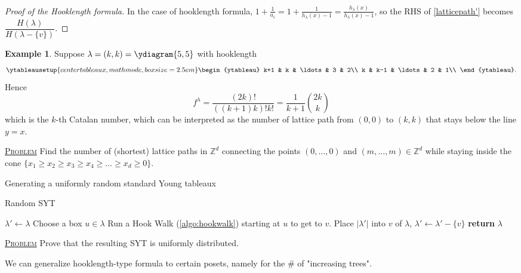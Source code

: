 \documentclass{report}
\newcommand{\Z}{\mathbb{Z}}
\newcommand{\fancyem}[1]{\underline{\textsc{#1}}}
\theoremstyle{definition}
\newtheorem{example}{Example}[section]
\theoremstyle{remark}
\numberwithin{equation}{section}
\begin{document}
\begin{proof}[Proof of the Hooklength formula]
In the case of hooklength formula, $\displaystyle 1 + \frac{1}{a_i} = 1 + \frac{1}{h_\lambda(x) - 1} = \frac{h_\lambda(x)}{h_\lambda(x) - 1}$, so the RHS of \eqref{latticepath'} becomes $\dfrac{H(\lambda)}{H(\lambda - \{v\})}$.
\end{proof}

\begin{example}
    Suppose $\lambda = (k, k) = \ydiagram{5, 5}$ with hooklength \[
        \ytableausetup{centertableaux, mathmode, boxsize=2.5em}
        \begin{ytableau}
            k+1 & k & \ldots & 3 & 2\\
            k & k-1 & \ldots & 2 & 1\\
        \end{ytableau}.
    \] Hence \[
        f^{\lambda} = \frac{(2k)!}{((k+1)k)!k!} = \frac{1}{k+1}\binom{2k}{k}
    \] which is the $k$-th Catalan number, which can be interpreted as the number of lattice path from $(0, 0)$ to $(k, k)$ that stays below the line $y = x$.
\end{example}

\fancyem{Problem} Find the number of (shortest) lattice paths in $\Z^d$ connecting the points $(0, \ldots, 0)$ and $(m, \ldots, m) \in \Z^d$ while staying inside the cone $\{x_1 \geq x_2 \geq x_3 \geq x_4 \geq \ldots \geq x_d \geq 0\}$.

Generating a uniformly random standard Young tableaux

\begin{algorithm}[h]
    \caption{Random SYT}
    \label{algo:unirandSYT}
    \begin{algorithmic}[1]
            \State $\lambda' \gets \lambda$
            \State Choose a box $u \in \lambda$
            \State Run a Hook Walk (\autoref{algo:hookwalk}) starting at $u$ to get to $v$.
            \State Place $|\lambda'|$ into $v$ of $\lambda$, $\lambda' \gets \lambda' - \{v\}$
            \EndWhile
            \State \textbf{return} $\lambda$
        \EndFunction
    \end{algorithmic}
\end{algorithm}
\fancyem{Problem} Prove that the resulting SYT is uniformly distributed.

We can generalize hooklength-type formula to certain posets, namely for the $\#$ of "increasing trees".
\end{document}
